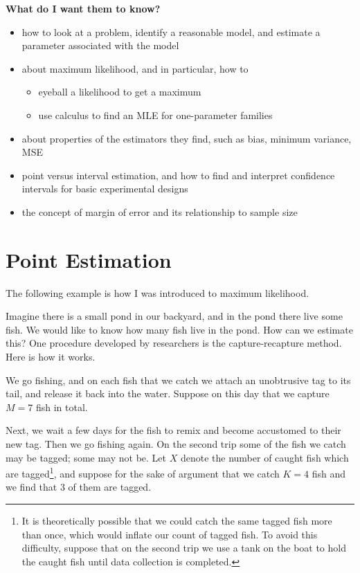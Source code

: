 \documentclass[]{book}
\providecommand{\tightlist}{%
  \setlength{\itemsep}{0pt}\setlength{\parskip}{0pt}}
\let\rmarkdownfootnote\footnote%
\def\footnote{\protect\rmarkdownfootnote}
\numberwithin{equation}{chapter}
\numberwithin{figure}{chapter}
\theoremstyle{plain}
\theoremstyle{definition}
\theoremstyle{remark}
\theoremstyle{definition}
\theoremstyle{definition}
\theoremstyle{remark}
\let\BeginKnitrBlock\begin \let\EndKnitrBlock\end
\begin{document}
\textbf{What do I want them to know?}

\begin{itemize}
\tightlist
\item
  how to look at a problem, identify a reasonable model, and estimate a
  parameter associated with the model
\item
  about maximum likelihood, and in particular, how to

  \begin{itemize}
  \tightlist
  \item
    eyeball a likelihood to get a maximum
  \item
    use calculus to find an MLE for one-parameter families
  \end{itemize}
\item
  about properties of the estimators they find, such as bias, minimum
  variance, MSE
\item
  point versus interval estimation, and how to find and interpret
  confidence intervals for basic experimental designs
\item
  the concept of margin of error and its relationship to sample size
\end{itemize}

\section{Point Estimation}\label{sec-point-estimation}

The following example is how I was introduced to maximum likelihood.

\bigskip

\BeginKnitrBlock{example}[Fishing, part one]
\protect\hypertarget{ex:how-many-fish}{}{\label{ex:how-many-fish}
\iffalse (Fishing, part one) \fi }Imagine there is a small pond in our
backyard, and in the pond there live some fish. We would like to know
how many fish live in the pond. How can we estimate this? One procedure
developed by researchers is the capture-recapture method. Here is how it
works.
\EndKnitrBlock{example}

We go fishing, and on each fish that we catch we attach an unobtrusive
tag to its tail, and release it back into the water. Suppose on this day
that we capture \(M=7\) fish in total.

Next, we wait a few days for the fish to remix and become accustomed to
their new tag. Then we go fishing again. On the second trip some of the
fish we catch may be tagged; some may not be. Let \(X\) denote the
number of caught fish which are tagged\footnote{It is theoretically
  possible that we could catch the same tagged fish more than once,
  which would inflate our count of tagged fish. To avoid this
  difficulty, suppose that on the second trip we use a tank on the boat
  to hold the caught fish until data collection is completed.}, and
suppose for the sake of argument that we catch \(K=4\) fish and we find
that 3 of them are tagged.
\end{document}

